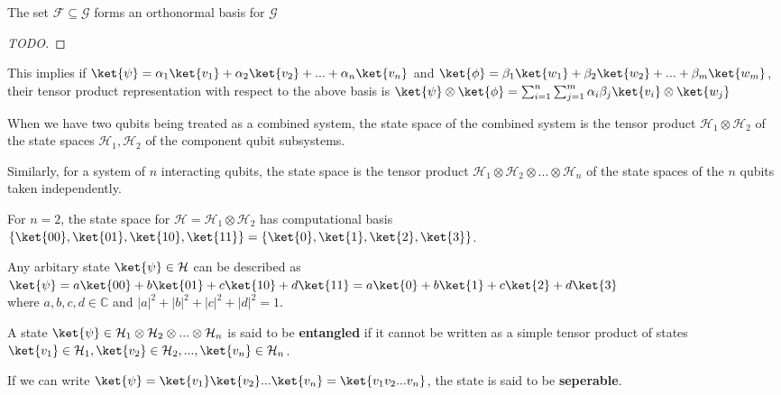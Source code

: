 \begin{thm}
    The set $\mathcal{F} \subseteq \mathcal{G}$ forms an orthonormal basis for $\mathcal{G}$
\end{thm}
\begin{proof}
    [TODO]
\end{proof}

This implies if $\ket{\psi} = \alpha_1 \ket{v_1} + \alpha_2 \ket{v_2} + ... + \alpha_n \ket{v_n}$ and $\ket{\phi} = \beta_1 \ket{w_1} + \beta_2 \ket{w_2} + ... + \beta_m \ket{w_m}$, their tensor product representation with respect to the above basis is $\ket{\psi} \otimes \ket{\phi} = \sum_{i=1}^n \sum_{j=1}^m \alpha_i \beta_j \ket{v_i} \otimes \ket{w_j}$


\begin{samepage}
    \begin{mdframed}
\begin{lemma}
When we have two qubits being treated as a combined system, the state space of the combined system is the tensor product $\mathcal{H}_1 \otimes \mathcal{H}_2$ of the state spaces $\mathcal{H}_1, \mathcal{H}_2$ of the component qubit subsystems. 

    Similarly, for a system of $n$ interacting qubits, the state space is the tensor product $\mathcal{H}_1 \otimes \mathcal{H}_2 \otimes ... \otimes \mathcal{H}_n$ of the state spaces of the $n$ qubits taken independently.
\end{lemma}
    \end{mdframed}
\end{samepage}

\begin{eg}
For $n=2$, the state space for $\mathcal{H} = \mathcal{H}_1 \otimes \mathcal{H}_2$ has computational basis $\{ \ket{00}, \ket{01}, \ket{10}, \ket{11} \} = \{ \ket{0}, \ket{1}, \ket{2}, \ket{3} \}$.

    Any arbitary state $\ket{\psi} \in \mathcal{H}$ can be described as $\ket{\psi} = a \ket{00} + b \ket{01} + c \ket{10} + d \ket{11} = a \ket{0} + b \ket{1} + c \ket{2} + d \ket{3}$ \\ where $a, b, c, d \in \mathbb{C}$ and $|a|^2 + |b|^2 + |c|^2 + |d|^2 = 1$.
\end{eg}


\begin{defn}
    A state $\ket{\psi} \in \mathcal{H}_1 \otimes \mathcal{H}_2 \otimes ... \otimes \mathcal{H}_n$ is said to be \textbf{entangled} if it cannot be written as a simple tensor product of states $\ket{v_1} \in \mathcal{H}_1, \ket{v_2} \in \mathcal{H}_2, ..., \ket{v_n} \in \mathcal{H}_n$. 

    If we can write $\ket{\psi} = \ket{v_1}\ket{v_2}...\ket{v_n} = \ket{v_1 v_2...v_n}$, the state is said to be \textbf{seperable}.
\end{defn}

